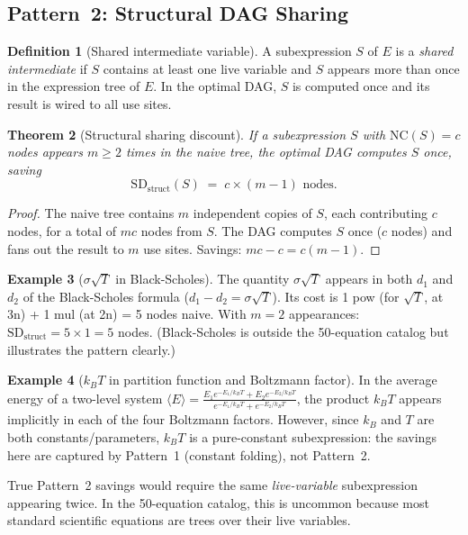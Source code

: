 \documentclass[12pt,a4paper]{article}
\newtheorem{theorem}{Theorem}[section]
\theoremstyle{definition}
\newtheorem{definition}[theorem]{Definition}
\newtheorem{example}[theorem]{Example}
\newcommand{\NC}{\mathrm{NC}}
\newcommand{\SD}{\mathrm{SD}}
\begin{document}
\subsection{Pattern~2: Structural DAG Sharing}
\label{sec:p2}

\begin{definition}[Shared intermediate variable]
A subexpression $S$ of $E$ is a \emph{shared intermediate} if $S$ contains
at least one live variable and $S$ appears more than once in the expression
tree of $E$.  In the optimal DAG, $S$ is computed once and its result is
wired to all use sites.
\end{definition}

\begin{theorem}[Structural sharing discount]\label{thm:structural}
If a subexpression $S$ with $\NC(S) = c$ nodes appears $m \geq 2$ times
in the naive tree, the optimal DAG computes $S$ once, saving
\[
  \SD_{\mathrm{struct}}(S) \;=\; c \times (m - 1) \text{ nodes.}
\]
\end{theorem}

\begin{proof}
The naive tree contains $m$ independent copies of $S$, each contributing
$c$ nodes, for a total of $mc$ nodes from $S$.  The DAG computes $S$
once ($c$ nodes) and fans out the result to $m$ use sites.  Savings:
$mc - c = c(m-1)$.
\end{proof}

\begin{example}[$\sigma\sqrt{T}$ in Black-Scholes]
The quantity $\sigma\sqrt{T}$ appears in both $d_1$ and $d_2$ of the
Black-Scholes formula ($d_1 - d_2 = \sigma\sqrt{T}$).  Its cost is
1 pow (for $\sqrt{T}$, at 3n) + 1 mul (at 2n) = 5 nodes naive.
With $m = 2$ appearances: $\SD_{\mathrm{struct}} = 5 \times 1 = 5$ nodes.
(Black-Scholes is outside the 50-equation catalog but illustrates the
pattern clearly.)
\end{example}

\begin{example}[$k_B T$ in partition function and Boltzmann factor]
In the average energy of a two-level system
$\langle E \rangle = \frac{E_1 e^{-E_1/k_BT} + E_2 e^{-E_2/k_BT}}
                         {e^{-E_1/k_BT} + e^{-E_2/k_BT}}$,
the product $k_B T$ appears implicitly in each of the four Boltzmann factors.
However, since $k_B$ and $T$ are both constants/parameters, $k_B T$ is a
pure-constant subexpression: the savings here are captured by Pattern~1
(constant folding), not Pattern~2.

True Pattern~2 savings would require the same \emph{live-variable}
subexpression appearing twice.  In the 50-equation catalog, this is
uncommon because most standard scientific equations are trees over their
live variables.
\end{example}
\end{document}
